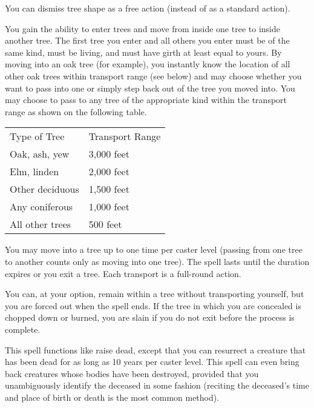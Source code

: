 \begin{multicols}{2}
\begin{small}
\smallskip\noindent You can dismiss tree shape as a free action (instead of as a standard action).

\noindent You gain the ability to enter trees and move from inside one tree to inside another tree. The first tree you enter and all others you enter must be of the same kind, must be living, and must have girth at least equal to yours. By moving into an oak tree (for example), you instantly know the location of all other oak trees within transport range (see below) and may choose whether you want to pass into one or simply step back out of the tree you moved into. You may choose to pass to any tree of the appropriate kind within the transport range as shown on the following table.
 
\begin{center}
\begin{tabular}[h!]{l|l}
Type of Tree & Transport Range \\
Oak, ash, yew & 3,000 feet \\
Elm, linden & 2,000 feet \\
Other deciduous & 1,500 feet \\	   
Any coniferous & 1,000 feet \\  
All other trees & 500 feet \\
\end{tabular}
\end{center}

\smallskip\noindent You may move into a tree up to one time per caster level (passing from one tree to another counts only as moving into one tree). The spell lasts until the duration expires or you exit a tree. Each transport is a full-round action.

\smallskip\noindent You can, at your option, remain within a tree without transporting yourself, but you are forced out when the spell ends. If the tree in which you are concealed is chopped down or burned, you are slain if you do not exit before the process is complete.

\noindent This spell functions like raise dead, except that you can resurrect a creature that has been dead for as long as 10 years per caster level. This spell can even bring back creatures whose bodies have been destroyed, provided that you unambiguously identify the deceased in some fashion (reciting the deceased's time and place of birth or death is the most common method).


\end{small}
\end{multicols}
